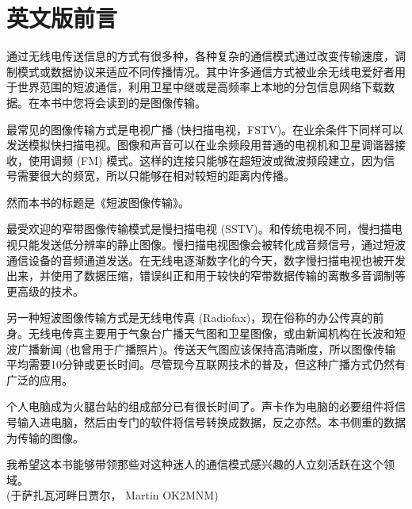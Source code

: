 \chapter*{英文版前言}

通过无线电传送信息的方式有很多种，各种复杂的通信模式通过改变传输速度，调制模式或数据协议来适应不同传播情况。其中许多通信方式被业余无线电爱好者用于世界范围的短波通信，利用卫星中继或是高频率上本地的分包信息网络下载数据。在本书中您将会读到的是图像传输。

最常见的图像传输方式是电视广播 (快扫描电视，FSTV)。在业余条件下同样可以发送模拟快扫描电视。图像和声音可以在业余频段用普通的电视机和卫星调谐器接收，使用调频 (FM) 模式。这样的连接只能够在超短波或微波频段建立，因为信号需要很大的频宽，所以只能够在相对较短的距离内传播。

然而本书的标题是《短波图像传输》。 

最受欢迎的窄带图像传输模式是慢扫描电视 (SSTV)。和传统电视不同，慢扫描电视只能发送低分辨率的静止图像。慢扫描电视图像会被转化成音频信号，通过短波通信设备的音频通道发送。在无线电逐渐数字化的今天，数字慢扫描电视也被开发出来，并使用了数据压缩，错误纠正和用于较快的窄带数据传输的离散多音调制等更高级的技术。

另一种短波图像传输方式是无线电传真 (Radiofax)，现在俗称的办公传真的前身。无线电传真主要用于气象台广播天气图和卫星图像，或由新闻机构在长波和短波广播新闻 (也曾用于广播照片)。传送天气图应该保持高清晰度，所以图像传输平均需要10分钟或更长时间。尽管现今互联网技术的普及，但这种广播方式仍然有广泛的应用。

个人电脑成为火腿台站的组成部分已有很长时间了。声卡作为电脑的必要组件将信号输入进电脑，然后由专门的软件将信号转换成数据，反之亦然。本书侧重的数据为传输的图像。

我希望这本书能够带领那些对这种迷人的通信模式感兴趣的人立刻活跃在这个领域。 \\[1cm]

(于萨扎瓦河畔日贾尔， Martin OK2MNM)